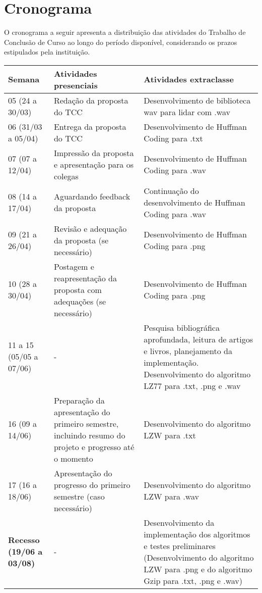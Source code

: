 \chapter{Cronograma}
\label{c.cronograma}

O cronograma a seguir apresenta a distribuição das atividades do Trabalho de Conclusão de Curso ao longo do período disponível, considerando os prazos estipulados pela instituição.

\begin{table}[htb]
    \centering
    \renewcommand{\arraystretch}{1.3}
    \begin{tabular}{|p{4cm}|p{5cm}|p{5cm}|}
        \hline
        \textbf{Semana} & \textbf{Atividades presenciais} & \textbf{Atividades extraclasse} \\
        \hline
        05 (24 a 30/03) & Redação da proposta do TCC & Desenvolvimento de biblioteca wav para lidar com .wav \\
        \hline
        06 (31/03 a 05/04) & Entrega da proposta do TCC & Desenvolvimento de Huffman Coding para .txt \\
        \hline
        07 (07 a 12/04) & Impressão da proposta e apresentação para os colegas & Desenvolvimento de Huffman Coding para .wav \\
        \hline
        08 (14 a 17/04) & Aguardando feedback da proposta & Continuação do desenvolvimento de Huffman Coding para .wav \\
        \hline
        09 (21 a 26/04) & Revisão e adequação da proposta (se necessário) & Desenvolvimento de Huffman Coding para .png \\
        \hline
        10 (28 a 30/04) & Postagem e reapresentação da proposta com adequações (se necessário) & Desenvolvimento de Huffman Coding para .png \\
        \hline
        11 a 15 (05/05 a 07/06) & - & Pesquisa bibliográfica aprofundada, leitura de artigos e livros, planejamento da implementação. Desenvolvimento do algoritmo LZ77 para .txt, .png e .wav \\
        \hline
        16 (09 a 14/06) & Preparação da apresentação do primeiro semestre, incluindo resumo do projeto e progresso até o momento & Desenvolvimento do algoritmo LZW para .txt \\
        \hline
        17 (16 a 18/06) & Apresentação do progresso do primeiro semestre (caso necessário) & Desenvolvimento do algoritmo LZW para .wav \\
        \hline
        \textbf{Recesso (19/06 a 03/08)} & - & Desenvolvimento da implementação dos algoritmos e testes preliminares (Desenvolvimento do algoritmo LZW para .png e do algoritmo Gzip para .txt, .png e .wav)\\

\end{tabular}
\end{table}
